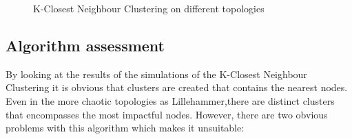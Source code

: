 \begin{figure}
		\centering
		\qquad
		\qquad

		\qquad
		\qquad
		\caption{K-Closest Neighbour Clustering on different topologies}%
		\label{fig:knearest}%
\end{figure}

\subsection{Algorithm assessment}
By looking at the results of the simulations of the K-Closest Neighbour Clustering it is obvious that clusters are created that contains the nearest nodes.
Even in the more chaotic topologies as Lillehammer,there are distinct clusters that encompasses the most impactful nodes. However, there are two obvious problems with this algorithm
which makes it unsuitable:

